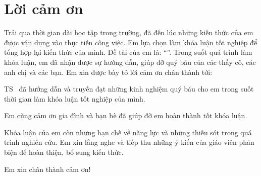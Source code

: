 \chapter*{Lời cảm ơn}
\label{thanks}

Trải qua thời gian dài học tập trong trường, đã đến lúc những kiến thức của em được vận dụng vào thực tiễn công việc. Em lựa chọn làm khóa luận tốt nghiệp để tổng hợp lại kiến thức của mình. Đề tài của em là: “\textit{\tenKL}”. Trong suốt quá trình làm khóa luận, em đã nhận được sự hướng dẫn, giúp đỡ quý báu của các thầy cô, các anh chị và các bạn. Em xin được bày tỏ lời cảm ơn chân thành tới:

TS \tenGVHD\ đã hướng dẫn và truyền đạt những kinh nghiệm quý báu cho em trong suốt thời gian làm khóa luận tốt nghiệp của mình.

Em cũng cảm ơn gia đình và bạn bè đã giúp đỡ em hoàn thành tốt khóa luận.

Khóa luận của em còn những hạn chế về năng lực và những thiếu sót trong quá trình nghiên cứu. Em xin lắng nghe và tiếp thu những ý kiến của giáo viên phản biện để hoàn thiện, bổ sung kiến thức.

Em xin chân thành cảm ơn!